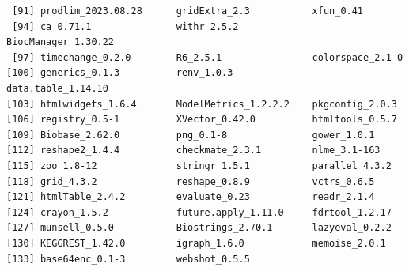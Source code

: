 \documentclass{amsart}
\begin{document}
\begin{verbatim}
 [91] prodlim_2023.08.28      gridExtra_2.3           xfun_0.41 
 [94] ca_0.71.1               withr_2.5.2             BiocManager_1.30.22
 [97] timechange_0.2.0        R6_2.5.1                colorspace_2.1-0
[100] generics_0.1.3          renv_1.0.3              data.table_1.14.10
[103] htmlwidgets_1.6.4       ModelMetrics_1.2.2.2    pkgconfig_2.0.3
[106] registry_0.5-1          XVector_0.42.0          htmltools_0.5.7
[109] Biobase_2.62.0          png_0.1-8               gower_1.0.1
[112] reshape2_1.4.4          checkmate_2.3.1         nlme_3.1-163
[115] zoo_1.8-12              stringr_1.5.1           parallel_4.3.2
[118] grid_4.3.2              reshape_0.8.9           vctrs_0.6.5
[121] htmlTable_2.4.2         evaluate_0.23           readr_2.1.4
[124] crayon_1.5.2            future.apply_1.11.0     fdrtool_1.2.17 
[127] munsell_0.5.0           Biostrings_2.70.1       lazyeval_0.2.2 
[130] KEGGREST_1.42.0         igraph_1.6.0            memoise_2.0.1 
[133] base64enc_0.1-3         webshot_0.5.5
\end{verbatim}
\end{document}
